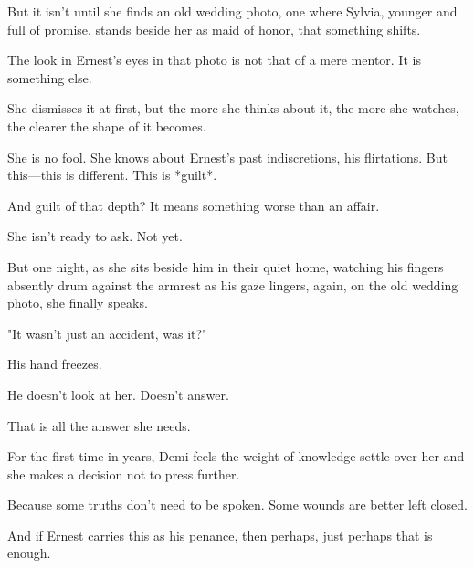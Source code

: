 But it isn’t until she finds an old wedding photo, one where Sylvia, younger and full of promise, stands beside her as maid of honor, that something shifts.  
\bigskip

The look in Ernest’s eyes in that photo is not that of a mere mentor. It is something else.  

She dismisses it at first, but the more she thinks about it, the more she watches, the clearer the shape of it becomes.  

She is no fool. She knows about Ernest’s past indiscretions, his flirtations. But this—this is different. This is *guilt*.  

And guilt of that depth? It means something worse than an affair.  

She isn’t ready to ask. Not yet.  

But one night, as she sits beside him in their quiet home, watching his fingers absently drum against the armrest as his gaze lingers, again, on the old wedding photo, she finally speaks.  

"It wasn’t just an accident, was it?"  

His hand freezes.  

He doesn’t look at her. Doesn’t answer.  

That is all the answer she needs.  

For the first time in years, Demi feels the weight of knowledge settle over her and she makes a decision not to press further. 

Because some truths don’t need to be spoken. Some wounds are better left closed.  

And if Ernest carries this as his penance, then perhaps, just perhaps that is enough.